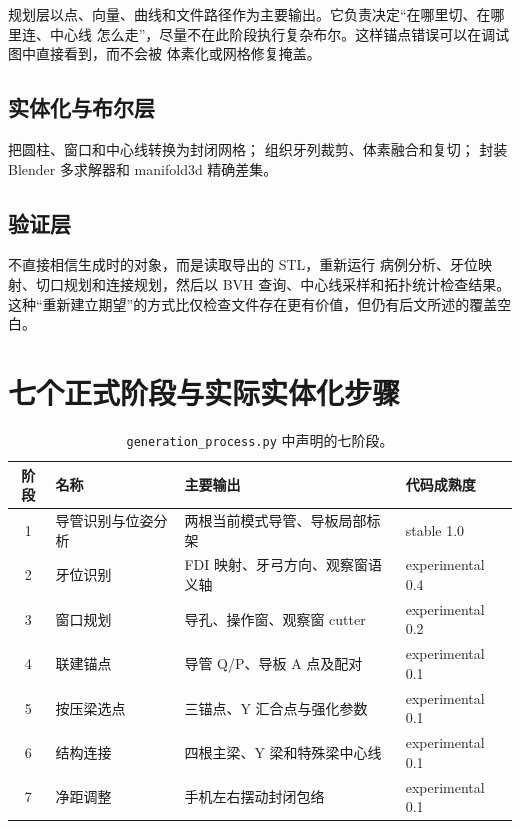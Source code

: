 规划层以点、向量、曲线和文件路径作为主要输出。它负责决定“在哪里切、在哪里连、中心线
怎么走”，尽量不在此阶段执行复杂布尔。这样锚点错误可以在调试图中直接看到，而不会被
体素化或网格修复掩盖。

\subsection{实体化与布尔层}

 把圆柱、窗口和中心线转换为封闭网格；
 组织牙列裁剪、体素融合和复切；
 封装 Blender 多求解器和 manifold3d 精确差集。

\subsection{验证层}

 不直接相信生成时的对象，而是读取导出的 STL，重新运行
病例分析、牙位映射、切口规划和连接规划，然后以 BVH 查询、中心线采样和拓扑统计检查结果。
这种“重新建立期望”的方式比仅检查文件存在更有价值，但仍有后文所述的覆盖空白。

\section{七个正式阶段与实际实体化步骤}

\begin{table}[H]
\centering
\small
\begin{tabularx}{\textwidth}{c p{} X p{}}
  \toprule
  阶段 & 名称 & 主要输出 & 代码成熟度\\
  \midrule
  1 & 导管识别与位姿分析 & 两根当前模式导管、导板局部标架 & stable 1.0\\
  2 & 牙位识别 & FDI 映射、牙弓方向、观察窗语义轴 & experimental 0.4\\
  3 & 窗口规划 & 导孔、操作窗、观察窗 cutter & experimental 0.2\\
  4 & 联建锚点 & 导管 Q/P、导板 A 点及配对 & experimental 0.1\\
  5 & 按压梁选点 & 三锚点、Y 汇合点与强化参数 & experimental 0.1\\
  6 & 结构连接 & 四根主梁、Y 梁和特殊梁中心线 & experimental 0.1\\
  7 & 净距调整 & 手机左右摆动封闭包络 & experimental 0.1\\
  \bottomrule
\end{tabularx}
\caption{\texttt{generation\_process.py} 中声明的七阶段。}
\end{table}

